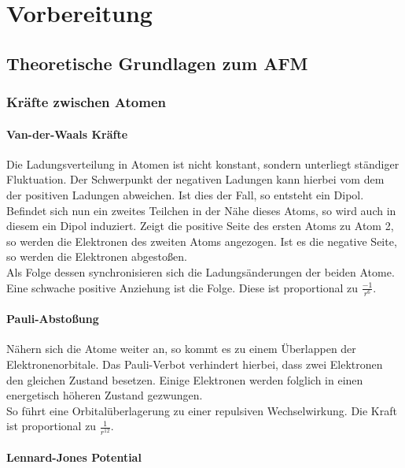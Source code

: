 \chapter{Vorbereitung}

\section{Theoretische Grundlagen zum AFM}
       
       
 \subsection{Kräfte zwischen Atomen}
        \subsubsection{Van-der-Waals Kräfte}

Die Ladungsverteilung in Atomen ist nicht konstant, sondern unterliegt ständiger 
Fluktuation. Der Schwerpunkt der negativen Ladungen kann hierbei vom dem der
positiven Ladungen abweichen. Ist dies der Fall, so entsteht ein Dipol. 
Befindet sich nun ein zweites Teilchen in der Nähe dieses Atoms, so wird auch
in diesem ein Dipol induziert. Zeigt die positive Seite des ersten Atoms zu Atom 2,
so werden die Elektronen des zweiten Atoms angezogen. Ist es die negative Seite, so
werden die Elektronen abgestoßen. 
\vspace{3pt}\\
Als Folge dessen synchronisieren sich die Ladungsänderungen der beiden Atome. Eine
schwache positive Anziehung ist die Folge. Diese ist proportional zu $\displaystyle
\frac{-1}{r^6}$.

        \subsubsection{Pauli-Abstoßung}

Nähern sich die Atome weiter an, so kommt es zu einem Überlappen der 
Elektronenorbitale. Das Pauli-Verbot verhindert hierbei, dass zwei Elektronen den
gleichen Zustand besetzen. Einige Elektronen werden folglich in einen energetisch
höheren Zustand gezwungen. \\
So führt eine Orbitalüberlagerung zu einer repulsiven Wechselwirkung. Die Kraft
ist proportional zu $\displaystyle \frac{1}{r^{12}}$.

        \subsubsection{Lennard-Jones Potential}

